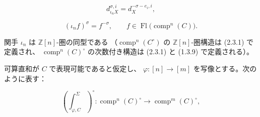 \begin{equation}
  d_{\iota_nX}^{\sigma,i}=d_X^{-\sigma-e_i,i},
  \tag{2.4.1.2}
\end{equation}

\begin{equation*}
  (\iota_nf)^\sigma=f^{-\sigma},
  \qquad f\in\operatorname{Fl}\bigl(\operatorname{comp}^{n}(C)\bigr).
\end{equation*}

関手 $\iota_n$ は $\mathbb Z[n]$-圏の同型である
（$\operatorname{comp}^{n}(C^\circ)$ の $\mathbb Z[n]$-圏構造は (2.3.1) で定義され、
$\operatorname{comp}^{n}(C)^\circ$ の次数付き構造は (2.3.1) と (1.3.9) で定義される）。

可算直和が $C$ で表現可能であると仮定し、
$\varphi\colon[n]\longrightarrow[m]$ を写像とする。次のように表す：

\begin{equation}
  \left(\int_{\varphi,C}^{\Sigma}\right)^\circ\colon
  \operatorname{comp}^{n}(C)^\circ
  \longrightarrow
  \operatorname{comp}^{m}(C)^\circ,
  \tag{2.4.1.3}
\end{equation}
